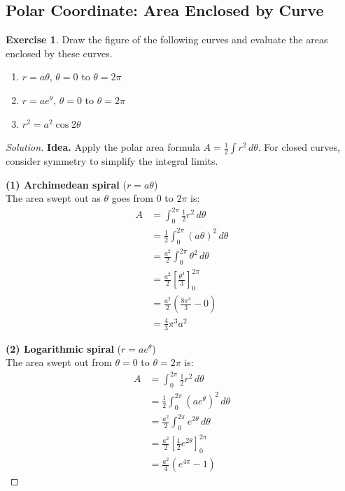 \documentclass[11pt]{article}
\theoremstyle{definition}
\newtheorem{exercise}{Exercise}[section]
\newenvironment{solution}{\begin{proof}[Solution]}{\end{proof}}
\begin{document}
\subsection{Polar Coordinate: Area Enclosed by Curve}

\begin{exercise}
Draw the figure of the following curves and evaluate the areas enclosed by these curves.
\begin{enumerate}
	\item $r=a\theta$, $\theta=0$ to $\theta=2\pi$
	\item $r=ae^\theta$, $\theta=0$ to $\theta=2\pi$
	\item $r^2=a^2\cos2\theta$
\end{enumerate}
\end{exercise}

\begin{solution}
\textbf{Idea.} Apply the polar area formula $A = \frac{1}{2}\int r^2\,d\theta$. For closed curves, consider symmetry to simplify the integral limits.

\textbf{(1) Archimedean spiral} ($r=a\theta$) \\
The area swept out as $\theta$ goes from $0$ to $2\pi$ is:
\begin{align*}
A &= \int_{0}^{2\pi} \frac{1}{2} r^2 \,d\theta \\
&= \frac{1}{2} \int_{0}^{2\pi} (a\theta)^2 \,d\theta \\
&= \frac{a^2}{2} \int_{0}^{2\pi} \theta^2 \,d\theta \\
&= \frac{a^2}{2} \left[ \frac{\theta^3}{3} \right]_0^{2\pi} \\
&= \frac{a^2}{2} \left( \frac{8\pi^3}{3} - 0 \right) \\
&= \frac{4}{3}\pi^3 a^2
\end{align*}

\textbf{(2) Logarithmic spiral} ($r=ae^\theta$) \\
The area swept out from $\theta=0$ to $\theta=2\pi$ is:
\begin{align*}
A &= \int_{0}^{2\pi} \frac{1}{2} r^2 \,d\theta \\
&= \frac{1}{2} \int_{0}^{2\pi} (ae^\theta)^2 \,d\theta \\
&= \frac{a^2}{2} \int_{0}^{2\pi} e^{2\theta} \,d\theta \\
&= \frac{a^2}{2} \left[ \frac{1}{2} e^{2\theta} \right]_0^{2\pi} \\
&= \frac{a^2}{4} (e^{4\pi} - 1)
\end{align*}


\end{solution}
\end{document}
